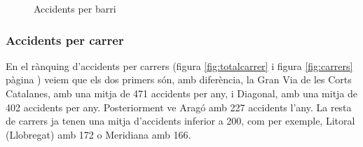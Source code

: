 \begin{figure}[H]
\footnotesize
\centering
{}%
\caption{Accidents per barri}
\label{fig:totalbarri}
\end{figure}

\subsubsection*{Accidents per carrer}

En el rànquing d'accidents per carrers (figura \ref{fig:totalcarrer} i figura \ref{fig:carrers} pàgina \pageref{fig:carrers}) veiem que els dos primers són, amb diferència, la Gran Via de les Corts Catalanes, amb una mitja de 471 accidents per any, i Diagonal, amb una mitja de 402 accidents per any. Posteriorment ve Aragó amb 227 accidents l'any. La resta de carrers ja tenen una mitja d'accidents inferior a 200, com per exemple, Litoral (Llobregat) amb 172 o Meridiana amb 166.

